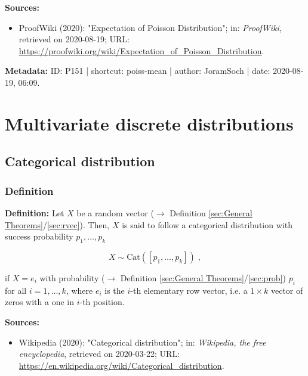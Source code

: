 \documentclass[a4paper,12pt,twoside]{book}
\begin{document}
\vspace{1em}
\textbf{Sources:}
\begin{itemize}
\item ProofWiki (2020): "Expectation of Poisson Distribution"; in: \textit{ProofWiki}, retrieved on 2020-08-19; URL: \url{https://proofwiki.org/wiki/Expectation_of_Poisson_Distribution}.
\end{itemize}


\vspace{1em}
\textbf{Metadata:} ID: P151 | shortcut: poiss-mean | author: JoramSoch | date: 2020-08-19, 06:09.
\vspace{1em}



\pagebreak
\section{Multivariate discrete distributions}

\subsection{Categorical distribution}

\subsubsection[\textit{Definition}]{Definition} \label{sec:cat}
\setcounter{equation}{0}

\textbf{Definition:} Let $X$ be a random vector ($\rightarrow$ Definition \ref{sec:General Theorems}/\ref{sec:rvec}). Then, $X$ is said to follow a categorical distribution with success probability $p_1, \ldots, p_k$

\begin{equation} \label{eq:cat-cat}
X \sim \mathrm{Cat}(\left[p_1, \ldots, p_k \right]) \; ,
\end{equation}

if $X = e_i$ with probability ($\rightarrow$ Definition \ref{sec:General Theorems}/\ref{sec:prob}) $p_i$ for all $i = 1, \ldots, k$, where $e_i$ is the $i$-th elementary row vector, i.e. a $1 \times k$ vector of zeros with a one in $i$-th position.


\vspace{1em}
\textbf{Sources:}
\begin{itemize}
\item Wikipedia (2020): "Categorical distribution"; in: \textit{Wikipedia, the free encyclopedia}, retrieved on 2020-03-22; URL: \url{https://en.wikipedia.org/wiki/Categorical_distribution}.
\end{itemize}
\end{document}

